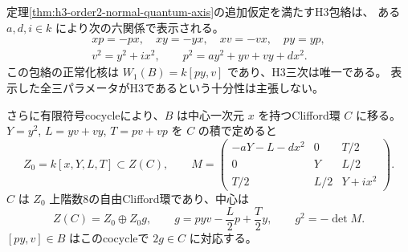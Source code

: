 \begin{theorem}[正規共通量子座標領域の三パラメータClifford帰着]
\label{thm:h3-order2-normal-axis-clifford-form}
定理\ref{thm:h3-order2-normal-quantum-axis}の追加仮定を満たすH3包絡は、
ある $a,d,i\in k$ により次の六関係で表示される。
\begin{equation}\label{eq:h3-normal-axis-three-parameter}
 \begin{gathered}
 xp=-px,\quad xy=-yx,\quad xv=-vx,\quad py=yp,\\
 v^2=y^2+i x^2,\qquad p^2=a y^2+yv+vy+d x^2.
 \end{gathered}
\end{equation}
この包絡の正常化核は $W_1(B)=k[py,v]$ であり、H3三次は唯一である。
表示した全三パラメータがH3であるという十分性は主張しない。

さらに有限符号cocycleにより、$B$ は中心一次元 $x$ を持つClifford環 $C$ に移る。
$Y=y^2$, $L=yv+vy$, $T=pv+vp$ を $C$ の積で定めると
\[
 Z_0=k[x,Y,L,T]\subset Z(C),\qquad
 M=\begin{pmatrix}
 -aY-L-dx^2&0&T/2\\
 0&Y&L/2\\
 T/2&L/2&Y+i x^2
 \end{pmatrix}.
\]
$C$ は $Z_0$ 上階数8の自由Clifford環であり、中心は
\[
 Z(C)=Z_0\oplus Z_0g,\qquad
 g=pyv-\frac L2p+\frac T2y,\qquad g^2=-\det M.
\]
$[py,v]\in B$ はこのcocycleで $2g\in C$ に対応する。
\end{theorem}
